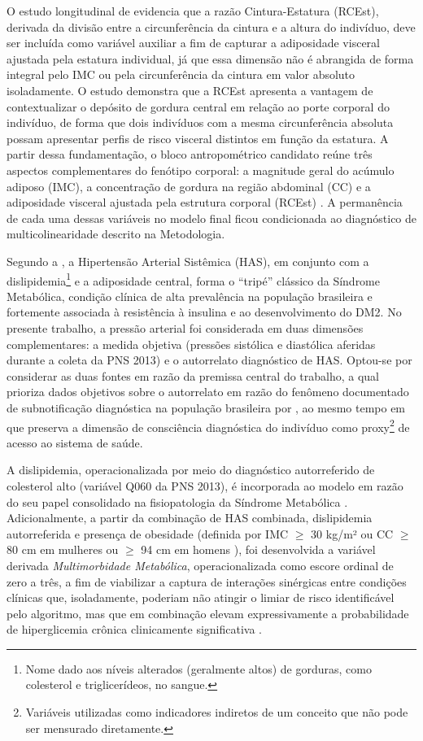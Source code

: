 O estudo longitudinal de \textcite{Son2016} evidencia que a razão Cintura-Estatura (RCEst), derivada da divisão entre a circunferência da cintura e a altura do indivíduo, deve ser incluída como variável auxiliar a fim de capturar a adiposidade visceral ajustada pela estatura individual, já que essa dimensão não é abrangida de forma integral pelo IMC ou pela circunferência da cintura em valor absoluto isoladamente. O estudo demonstra que a RCEst apresenta a vantagem de contextualizar o depósito de gordura central em relação ao porte corporal do indivíduo, de forma que dois indivíduos com a mesma circunferência absoluta possam apresentar perfis de risco visceral distintos em função da estatura. A partir dessa fundamentação, o bloco antropométrico candidato reúne três aspectos complementares do fenótipo corporal: a magnitude geral do acúmulo adiposo (IMC), a concentração de gordura na região abdominal (CC) e a adiposidade visceral ajustada pela estrutura corporal (RCEst) \cite{mlynarska2025type, Feller2010,Son2016}. A permanência de cada uma dessas variáveis no modelo final ficou condicionada ao diagnóstico de multicolinearidade descrito na Metodologia.

Segundo a \textcite{SBD2019}, a Hipertensão Arterial Sistêmica (HAS), em conjunto com a dislipidemia\footnote{Nome dado aos níveis alterados (geralmente altos) de gorduras, como colesterol e triglicerídeos, no sangue.} e a adiposidade central, forma o ``tripé'' clássico da Síndrome Metabólica, condição clínica de alta prevalência na população brasileira e fortemente associada à resistência à insulina e ao desenvolvimento do DM2. No presente trabalho, a pressão arterial foi considerada em duas dimensões complementares: a medida objetiva (pressões sistólica e diastólica aferidas durante a coleta da PNS 2013) e o autorrelato diagnóstico de HAS. Optou-se por considerar as duas fontes em razão da premissa central do trabalho, a qual prioriza dados objetivos sobre o autorrelato em razão do fenômeno documentado de subnotificação diagnóstica na população brasileira por \textcite{muzy2021prevalencia}, ao mesmo tempo em que preserva a dimensão de consciência diagnóstica do indivíduo como proxy\footnote{Variáveis utilizadas como indicadores indiretos de um conceito que não pode ser mensurado diretamente.} de acesso ao sistema de saúde.

A dislipidemia, operacionalizada por meio do diagnóstico autorreferido de colesterol alto (variável Q060 da PNS 2013), é incorporada ao modelo em razão do seu papel consolidado na fisiopatologia da Síndrome Metabólica \cite{mlynarska2025type, SBD2019}. Adicionalmente, a partir da combinação de HAS combinada, dislipidemia autorreferida e presença de obesidade (definida por IMC $\geq$ 30 kg/m² ou CC $\geq$ 80 cm em mulheres ou $\geq$ 94 cm em homens \cite{SBD2019}), foi desenvolvida a variável derivada \textit{Multimorbidade Metabólica}, operacionalizada como escore ordinal de zero a três, a fim de viabilizar a captura de interações sinérgicas entre condições clínicas que, isoladamente, poderiam não atingir o limiar de risco identificável pelo algoritmo, mas que em combinação elevam expressivamente a probabilidade de hiperglicemia crônica clinicamente significativa \cite{SBD2019, rzewuska2017epidemiology}.


